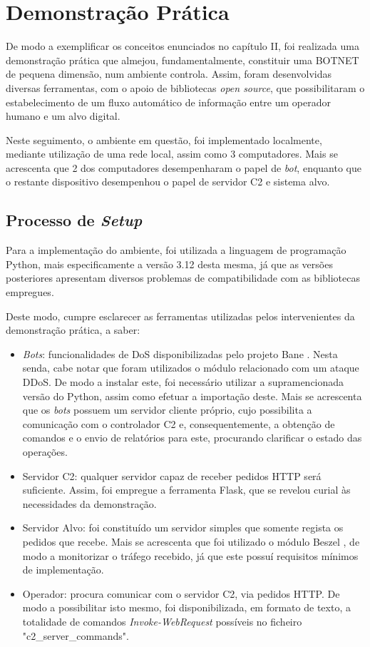 \section{Demonstração Prática}
De modo a exemplificar os conceitos enunciados no capítulo II, foi realizada uma demonstração prática que almejou, fundamentalmente, constituir uma BOTNET de pequena dimensão, num ambiente controla. Assim, foram desenvolvidas diversas ferramentas, com o apoio de bibliotecas \textit{open source}, que possibilitaram o estabelecimento de um fluxo automático de informação entre um operador humano e um alvo digital.

Neste seguimento, o ambiente em questão, foi implementado localmente, mediante utilização de uma rede local, assim como 3 computadores. Mais se acrescenta que 2 dos computadores desempenharam o papel de \textit{bot}, enquanto que o restante dispositivo desempenhou o papel de servidor C2 e sistema alvo.

\subsection{Processo de \textit{Setup}}
Para a implementação do ambiente, foi utilizada a linguagem de programação Python, mais especificamente a versão 3.12 desta mesma, já que as versões posteriores apresentam diversos problemas de compatibilidade com as bibliotecas empregues.


Deste modo, cumpre esclarecer as ferramentas utilizadas pelos intervenientes da demonstração prática, a saber:
\begin{itemize}
    \item \textit{Bots}: funcionalidades de DoS disponibilizadas pelo projeto Bane \cite{github_bane}. Nesta senda, cabe notar que foram utilizados o módulo relacionado com um ataque DDoS. De modo a instalar este, foi necessário utilizar a supramencionada versão do Python, assim como efetuar a importação deste. Mais se acrescenta que os \textit{bots} possuem um servidor cliente próprio, cujo possibilita a comunicação com o controlador C2 e, consequentemente, a obtenção de comandos e o envio de relatórios para este, procurando clarificar o estado das operações.
    \item Servidor C2: qualquer servidor capaz de receber pedidos HTTP será suficiente. Assim, foi empregue a ferramenta Flask, que se revelou curial às necessidades da demonstração.
    \item Servidor Alvo: foi constituído um servidor simples que somente regista os pedidos que recebe. Mais se acrescenta que foi utilizado o módulo Beszel \cite{github_beszel}, de modo a monitorizar o tráfego recebido, já que este possuí requisitos mínimos de implementação.
    \item Operador: procura comunicar com o servidor C2, via pedidos HTTP. De modo a possibilitar isto mesmo, foi disponibilizada, em formato de texto, a totalidade de comandos \textit{Invoke-WebRequest} possíveis no ficheiro "c2\_server\_commands".
\end{itemize}

